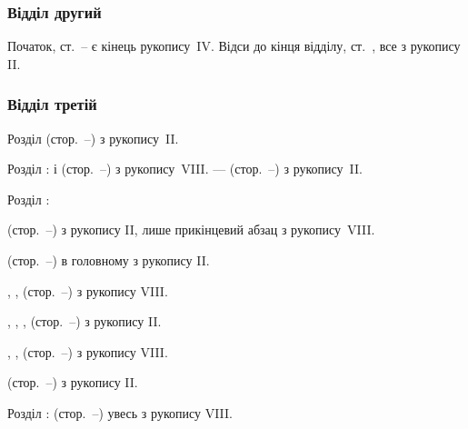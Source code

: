 \subsubsection*{Відділ другий}

Початок, ст.~\pageref{original-104}--\pageref{original-112} є кінець рукопису~IV.
Відси до кінця відділу, ст.~\pageref{original-266}, все з рукопису II.

\subsubsection*{Відділ третій}

Розділ  (стор.~\pageref{original-267}--\pageref{original-273}) з рукопису~II.

\noindent{}Розділ :  і  (стор.~\pageref{original-274}--\pageref{original-298}) з рукопису~VIII.
—  (стор.~\pageref{original-298}--\pageref{original-300-1}) з рукопису~II.

\noindent{}Розділ :

 (стор.~\pageref{original-300-2}--\pageref{original-302-1}) з рукопису II,
лише прикінцевий абзац з рукопису~VIII.

 (стор.~\pageref{original-303}--\pageref{original-305-1}) в головному з рукопису II.

, ,  (стор.~\pageref{original-305-2}--\pageref{original-325-1}) з рукопису VIII.

, , , 
(стор.~\pageref{original-325-2}--\pageref{original-337}) з рукопису II.

, , 
(стор.~\pageref{original-338}--\pageref{original-373-1}) з рукопису VIII.

 (стор.~\pageref{original-373-2}--\pageref{original-380-1}) з рукопису II.

\noindent{}Розділ : (стор.~\pageref{original-380-2}--\pageref{original-409}) увесь з рукопису VIII.



% 







